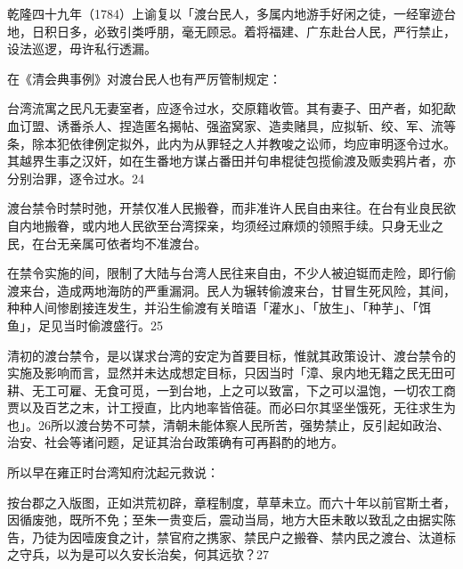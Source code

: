 乾隆四十九年（1784）上谕复以「渡台民人，多属内地游手好闲之徒，一经窜迹台地，日积日多，必致引类呼朋，毫无顾忌。着将福建、广东赴台人民，严行禁止，设法巡逻，毋许私行透漏。

在《清会典事例》对渡台民人也有严厉管制规定：

\begin{BookQuote}
台湾流寓之民凡无妻室者，应逐令过水，交原籍收管。其有妻子、田产者，如犯歃血订盟、诱番杀人、捏造匿名揭帖、强盗窝家、造卖赌具，应拟斩、绞、军、流等条，除本犯依律例定拟外，此内为从罪轻之人并教唆之讼师，均应审明逐令过水。其越界生事之汉奸，如在生番地方谋占番田并句串棍徒包揽偷渡及贩卖鸦片者，亦分别治罪，逐令过水。24
\end{BookQuote}

渡台禁令时禁时弛，开禁仅准人民搬眷，而非准许人民自由来往。在台有业良民欲自内地搬眷，或内地人民欲至台湾探亲，均须经过麻烦的领照手续。只身无业之民，在台无亲属可依者均不准渡台。

在禁令实施的间，限制了大陆与台湾人民往来自由，不少人被迫铤而走险，即行偷渡来台，造成两地海防的严重漏洞。民人为辗转偷渡来台，甘冒生死风险，其间，种种人间惨剧接连发生，并沿生偷渡有关暗语「灌水」、「放生」、「种芋」、「饵鱼」，足见当时偷渡盛行。25

清初的渡台禁令，是以谋求台湾的安定为首要目标，惟就其政策设计、渡台禁令的实施及影响而言，显然并未达成想定目标，只因当时「漳、泉内地无籍之民无田可耕、无工可雇、无食可觅，一到台地，上之可以致富，下之可以温饱，一切农工商贾以及百艺之末，计工授直，比内地率皆倍蓰。而必曰尔其坚坐饿死，无往求生为也」。26所以渡台势不可禁，清朝未能体察人民所苦，强势禁止，反引起如政治、治安、社会等诸问题，足证其治台政策确有可再斟酌的地方。

\vfill
\begin{BookNotes}
\end{BookNotes}

所以早在雍正时台湾知府沈起元救说：

\begin{BookQuote}
按台郡之入版图，正如洪荒初辟，章程制度，草草未立。而六十年以前官斯土者，因循废弛，既所不免；至朱一贵变后，震动当局，地方大臣未敢以致乱之由据实陈告，乃徒为因噎废食之计，禁官府之携家、禁民户之搬眷、禁内民之渡台、汰道标之守兵，以为是可以久安长治矣，何其远欤？27
\end{BookQuote}

